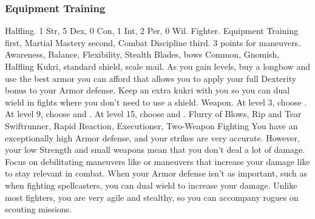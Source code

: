         \subsubsection{Equipment Training}
             Halfling.
             1 Str, 5 Dex, 0 Con, 1 Int, 2 Per, 0 Wil.
             Fighter.
             Equipment Training first, Martial Mastery second, Combat Discipline third.
             3 points for maneuvers.
             Awareness, Balance, Flexibility, Stealth
             Blades, bows
             Common, Gnomish, Halfling
             Kukri, standard shield, scale mail. As you gain levels, buy a longbow and use the best armor you can afford that allows you to apply your full Dexterity bonus to your Armor defense.
                Keep an extra kukri with you so you can dual wield in fights where you don't need to use a shield.
             Weapon.
                At level 3, choose .
                At level 9, choose  and .
                At level 15, choose  and .
             Flurry of Blows, Rip and Tear
             Swiftrunner, Rapid Reaction, Executioner, Two-Weapon Fighting
             You have an exceptionally high Armor defense, and your strikes are very accurate.
            However, your low Strength and small weapons mean that you don't deal a lot of damage.
            Focus on debilitating maneuvers like  or maneuvers that increase your damage like  to stay relevant in combat.
            When your Armor defense isn't as important, such as when fighting spellcasters, you can dual wield to increase your damage.
            Unlike most fighters, you are very agile and stealthy, so you can accompany rogues on scouting missions.

